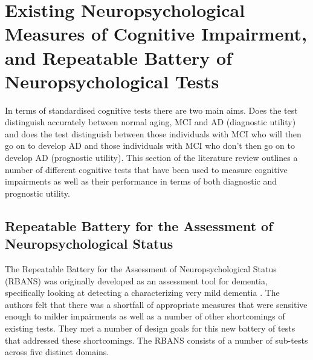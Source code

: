 \section{Existing Neuropsychological Measures of Cognitive Impairment, and Repeatable Battery of Neuropsychological Tests}
In terms of standardised cognitive tests there are two main aims. Does the test distinguish accurately between normal aging, MCI and AD (diagnostic utility) and does the test distinguish between those individuals with MCI who will then go on to develop AD and those individuals with MCI who don't then go on to develop AD (prognostic utility). This section of the literature review outlines a number of different cognitive tests that have been used to measure cognitive impairments as well as their performance in terms of both diagnostic and prognostic utility.
\par 
\subsection{Repeatable Battery for the Assessment of Neuropsychological Status}
The Repeatable Battery for the Assessment of Neuropsychological Status (RBANS) was originally developed as an assessment tool for dementia, specifically looking at detecting a characterizing very mild dementia \cite{Randolph1998}. The authors felt that there was a shortfall of appropriate measures that were sensitive enough to milder impairments as well as a number of other shortcomings of existing tests. They met a number of design goals for this new battery of tests that addressed these shortcomings. The RBANS consists of a number of sub-tests across five distinct domains.

